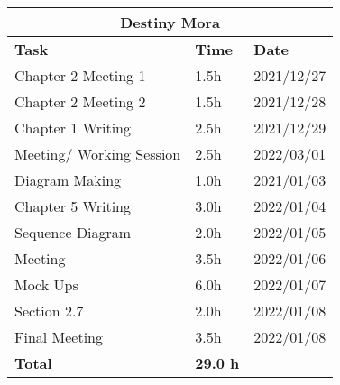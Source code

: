 \begin{table}[H]
\centering
\begin{tabular}{|p{}|p{}|p{}|}
\hline
\multicolumn{3}{|c|}{\textbf{Destiny Mora}}\\\hline
\textbf{Task} & \textbf{Time} & \textbf{Date}\\\hline
Chapter 2 Meeting 1 		& 1.5h 	& 2021/12/27\\\hline
Chapter 2 Meeting 2 		& 1.5h 	& 2021/12/28\\\hline
Chapter 1 Writing 			& 2.5h 	& 2021/12/29\\\hline
Meeting/ Working Session 	& 2.5h 	& 2022/03/01\\\hline
Diagram Making 				& 1.0h 	& 2021/01/03\\\hline
Chapter 5 Writing 			& 3.0h 	& 2022/01/04\\\hline
Sequence Diagram 			& 2.0h 	& 2022/01/05\\\hline
Meeting						& 3.5h	& 2022/01/06\\\hline
Mock Ups					& 6.0h 	& 2022/01/07\\\hline
Section 2.7 				& 2.0h 	& 2022/01/08\\\hline
Final Meeting				& 3.5h	& 2022/01/08 \\\hline

\textbf{Total} & \textbf{29.0 h} &\\\hline
\end{tabular}
\end{table}
